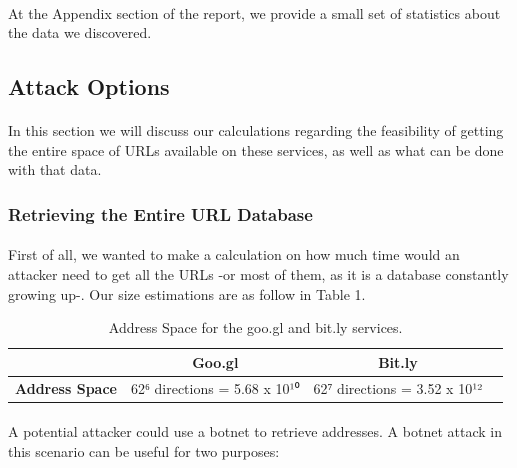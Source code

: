 \documentclass[12pt]{article}
\begin{document}
\paragraph{}
At the Appendix section of the report, we provide a small set of statistics about the data we discovered.

\subsection{Attack Options}

\paragraph{}
In this section we will discuss our calculations regarding the feasibility of getting the entire space of URLs available on these services, as well as what can be done with that data.

\subsubsection{Retrieving the Entire URL Database}

\paragraph{}
First of all, we wanted to make a calculation on how much time would an attacker need to get all the URLs -or most of them, as it is a database constantly growing up-. Our size estimations are as follow in Table 1.

\begin{table}[h]
	\centering
		\begin{tabular}{ | l | c | c | c |}
 			\hline
			  & \textbf{Goo.gl} & \textbf{Bit.ly} \\ \hline
 			\textbf{Address Space} & 62⁶ directions = 5.68 x 10¹⁰ & 62⁷ directions = 3.52 x 10¹² \\
 			\hline
  		\end{tabular}
	\caption[A table]{Address Space for the goo.gl and bit.ly services.}
	\label{tab:albums}
\end{table}

\paragraph{}
A potential attacker could use a botnet to retrieve addresses. A botnet attack in this scenario can be useful for two purposes:
\end{document}
